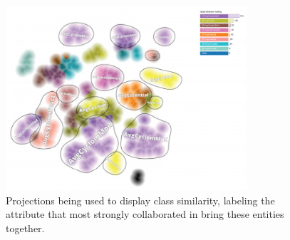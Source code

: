 \begin{figure}
	\centering
	\includegraphics[width=0.8\textwidth]{figures/mem.png}
	\caption{Projections being used to display class similarity, labeling the attribute that most strongly collaborated in bring these entities together.}
	\label{fig:mem}
\end{figure}

